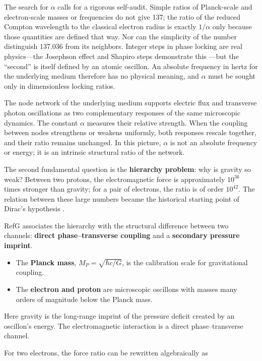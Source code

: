 \documentclass[11pt,a4paper]{article}
\begin{document}
The search for $\alpha$ calls for a rigorous self-audit. Simple ratios of Planck-scale and electron-scale masses or frequencies do not give 137; the ratio of the reduced Compton wavelength to the classical electron radius is exactly $1/\alpha$ only because those quantities are defined that way. Nor can the simplicity of the number distinguish 137.036 from its neighbors. Integer steps in phase locking are real physics---the Josephson effect and Shapiro steps demonstrate this \citep{josephson1962,shapiro1963}---but the “second” is itself defined by an atomic oscillon. An absolute frequency in hertz for the underlying medium therefore has no physical meaning, and $\alpha$ must be sought only in dimensionless locking ratios.

The node network of the underlying medium supports electric flux and transverse photon oscillations as two complementary responses of the same microscopic dynamics. The constant $\alpha$ measures their relative strength. When the coupling between nodes strengthens or weakens uniformly, both responses rescale together, and their ratio remains unchanged. In this picture, $\alpha$ is not an absolute frequency or energy; it is an intrinsic structural ratio of the network.

The second fundamental question is the \textbf{hierarchy problem}: why is gravity so weak? Between two protons, the electromagnetic force is approximately $10^{36}$ times stronger than gravity; for a pair of electrons, the ratio is of order $10^{42}$. The relation between these large numbers became the historical starting point of Dirac's hypothesis \citep{dirac1937}.

RefG associates the hierarchy with the structural difference between two channels: \textbf{direct phase--transverse coupling} and a \textbf{secondary pressure imprint}.

\begin{itemize}
\item The \textbf{Planck mass}, $M_P=\sqrt{\hbar c/G}$, is the calibration scale for gravitational coupling.
\item The \textbf{electron and proton} are microscopic oscillons with masses many orders of magnitude below the Planck mass.
\end{itemize}

Here gravity is the long-range imprint of the pressure deficit created by an oscillon's energy. The electromagnetic interaction is a direct phase--transverse channel.

For two electrons, the force ratio can be rewritten algebraically as
\end{document}
